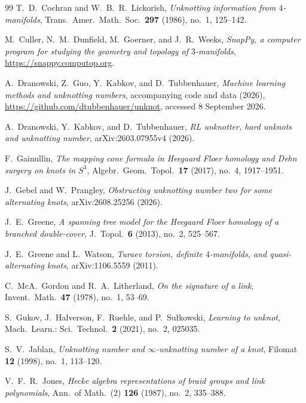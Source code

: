 \documentclass[12pt, oneside]{amsart}
\begin{document}
\begin{thebibliography}{99}
     T.~D.~Cochran and W.~B.~R.~Lickorish, \emph{Unknotting information from
        $4$-manifolds}, Trans.\ Amer.\ Math.\ Soc.\ \textbf{297} (1986), no.~1, 125--142.

     M.~Culler, N.~M.~Dunfield, M.~Goerner, and J.~R.~Weeks, \emph{SnapPy, a
        computer program for studying the geometry and topology of $3$-manifolds},
    \url{https://snappy.computop.org}.

     A.~Dranowski, Z.~Guo, Y.~Kabkov, and D.~Tubbenhauer,
    \emph{Machine learning methods and unknotting numbers}, accompanying code and data
    (2026), \url{https://github.com/dtubbenhauer/unknot}, accessed 8 September 2026.

     A.~Dranowski, Y.~Kabkov, and D.~Tubbenhauer, \emph{RL unknotter, hard unknots
        and unknotting number}, arXiv:2603.07955v4 (2026).

     F.~Gainullin, \emph{The mapping cone formula in Heegaard Floer homology and
        Dehn surgery on knots in $S^3$}, Algebr.\ Geom.\ Topol.\ \textbf{17} (2017), no.~4, 1917--1951.

     J.~Gebel and W.~Prangley, \emph{Obstructing unknotting number two for some alternating
        knots}, arXiv:2608.25256 (2026).

     J.~E.~Greene, \emph{A spanning tree model for the Heegaard Floer homology
        of a branched double-cover}, J.~Topol.\ \textbf{6} (2013), no.~2, 525--567.

     J.~E.~Greene and L.~Watson, \emph{Turaev torsion, definite
    $4$-manifolds, and quasi-alternating knots}, arXiv:1106.5559 (2011).

     C.~McA.~Gordon and R.~A.~Litherland, \emph{On the signature of a link}, Invent.\
    Math.\ \textbf{47} (1978), no.~1, 53--69.

     S.~Gukov, J.~Halverson, F.~Ruehle, and P.~Su{\l}kowski,
    \emph{Learning to unknot}, Mach.\ Learn.: Sci.\ Technol.\ \textbf{2} (2021), no.~2,
    025035.

     S.~V.~Jablan, \emph{Unknotting number and $\infty$-unknotting number of a
        knot}, Filomat \textbf{12} (1998), no.~1, 113--120.

     V.~F.~R.~Jones, \emph{Hecke algebra representations of braid groups and link
        polynomials}, Ann.\ of Math.\ (2) \textbf{126} (1987), no.~2, 335--388.


\end{thebibliography}
\end{document}
